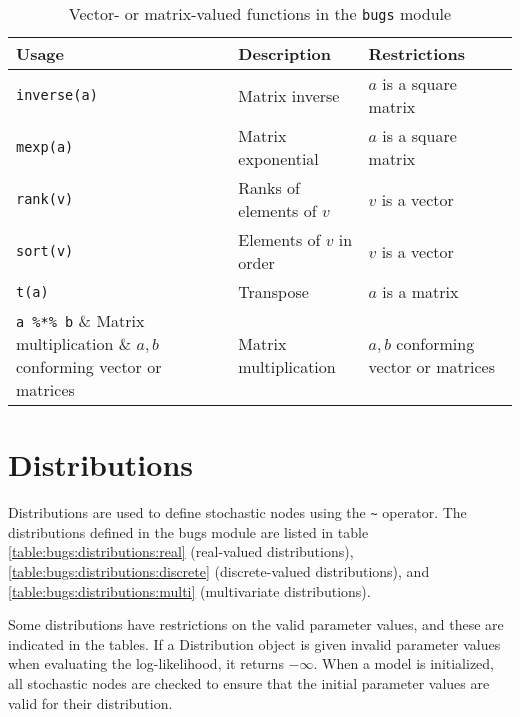 \documentclass[11pt, a4paper, titlepage]{report}
\begin{document}
\begin{table}
\begin{center}
\begin{tabular}{lll}
\hline
Usage & Description & Restrictions \\
\hline
\verb+inverse(a)+ & Matrix inverse & $a$ is a square matrix  \\
\verb+mexp(a)+ & Matrix exponential & $a$ is a square matrix \\
\verb+rank(v)+ & Ranks of elements of $v$ & $v$ is a vector   \\
\verb+sort(v)+ & Elements of $v$ in order & $v$ is a vector  \\
\verb+t(a)+    & Transpose                & $a$ is a matrix \\
\verb+a %*% b+  & Matrix multiplication & $a,b$ conforming vector or matrices\\

\hline
\end{tabular}
\caption{Vector- or matrix-valued functions in the \texttt{bugs}
  module \label{table:bugs:vector}}
\end{center}
\end{table}

\chapter{Distributions}
\label{section:distributions}

Distributions are used to define stochastic nodes using the \verb+~+
operator. The distributions defined in the bugs module are listed in
table \ref{table:bugs:distributions:real} (real-valued distributions),
\ref{table:bugs:distributions:discrete} (discrete-valued
distributions), and \ref{table:bugs:distributions:multi}
(multivariate distributions).

Some distributions have restrictions on the valid parameter values,
and these are indicated in the tables. If a Distribution object is
given invalid parameter values when evaluating the log-likelihood, it
returns $-\infty$. When a model is initialized, all stochastic nodes
are checked to ensure that the initial parameter values are valid for
their distribution.
\end{document}
